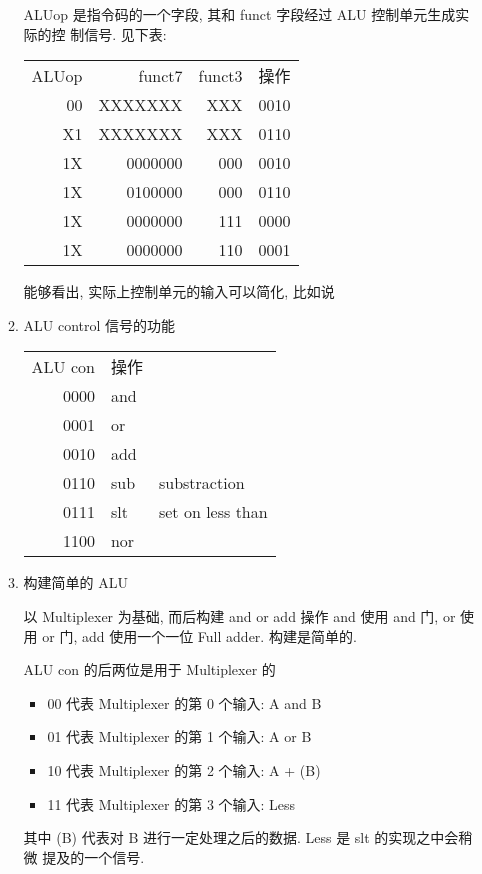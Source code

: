 \documentclass[11pt]{ctexart}
\begin{document}
\begin{enumerate}
\begin{enumerate}
ALUop 是指令码的一个字段, 其和 funct 字段经过 ALU 控制单元生成实际的控
制信号. 见下表:

\begin{center}
\begin{tabular}{rrrr}
ALUop & funct7 & funct3 & 操作\\
00 & XXXXXXX & XXX & 0010\\
X1 & XXXXXXX & XXX & 0110\\
1X & 0000000 & 000 & 0010\\
1X & 0100000 & 000 & 0110\\
1X & 0000000 & 111 & 0000\\
1X & 0000000 & 110 & 0001\\
\end{tabular}
\end{center}

能够看出, 实际上控制单元的输入可以简化, 比如说
\item ALU control 信号的功能
\label{sec:org8a4e9fb}

\begin{center}
\begin{tabular}{rll}
ALU con & 操作 & \\
0000 & and & \\
0001 & or & \\
0010 & add & \\
0110 & sub & substraction\\
0111 & slt & set on less than\\
1100 & nor & \\
\end{tabular}
\end{center}

\item 构建简单的 ALU
\label{sec:org0b66fab}

以 Multiplexer 为基础, 而后构建 and or add 操作
and 使用 and 门, or 使用 or 门, add 使用一个一位 Full adder. 
构建是简单的.

ALU con 的后两位是用于 Multiplexer 的
\begin{itemize}
\item 00 代表 Multiplexer 的第 0 个输入: A and B
\item 01 代表 Multiplexer 的第 1 个输入: A or  B
\item 10 代表 Multiplexer 的第 2 个输入: A + (B)
\item 11 代表 Multiplexer 的第 3 个输入: Less
\end{itemize}

其中 (B) 代表对 B 进行一定处理之后的数据. Less 是 slt 的实现之中会稍微
提及的一个信号. 


\end{enumerate}
\end{enumerate}
\end{document}
